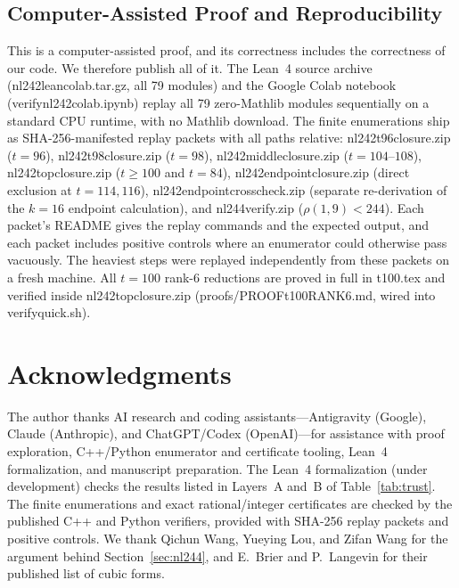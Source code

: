 \documentclass[11pt]{article}
\theoremstyle{definition}
\newcommand{\code}[1]{{\ttfamily\small\renewcommand{\_}{\textunderscore\allowbreak}#1}}
\begin{document}
\subsection{Computer-Assisted Proof and Reproducibility}
This is a computer-assisted proof, and its correctness includes the correctness of our code. We therefore publish all of it.
The Lean~4 source archive (\code{nl242\_lean\_colab.tar.gz}, all 79 modules) and the Google Colab notebook (\code{verify\_nl242\_colab.ipynb}) replay all 79 zero-Mathlib modules sequentially on a standard CPU runtime, with no Mathlib download.
The finite enumerations ship as SHA-256-manifested replay packets with all paths relative:
\code{nl242\_t96\_closure.zip} ($t = 96$),
\code{nl242\_t98\_closure.zip} ($t = 98$),
\code{nl242\_middle\_closure.zip} ($t = 104$--$108$),
\code{nl242\_top\_closure.zip} ($t \ge 100$ and $t = 84$),
\code{nl242\_endpoint\_closure.zip} (direct exclusion at $t=114,116$),
\code{nl242\_endpoint\_crosscheck.zip} (separate re-derivation of the $k=16$ endpoint calculation),
and \code{nl244\_verify.zip} ($\rho(1,9) < 244$).
Each packet's README gives the replay commands and the expected output, and each packet includes positive controls where an enumerator could otherwise pass vacuously.
The heaviest steps were replayed independently from these packets on a fresh machine. All $t = 100$ rank-$6$ reductions are proved in full in \code{t100.tex} and verified inside \code{nl242\_top\_closure.zip} (\code{proofs/PROOF\_t100\_RANK6.md}, wired into \code{verify\_quick.sh}).

\section*{Acknowledgments}
The author thanks AI research and coding assistants---Antigravity (Google), Claude (Anthropic), and ChatGPT/Codex (OpenAI)---for assistance with proof exploration, C++/Python enumerator and certificate tooling, Lean~4 formalization, and manuscript preparation. The Lean~4 formalization (under development) checks the results listed in Layers~A and~B of Table~\ref{tab:trust}. The finite enumerations and exact rational/integer certificates are checked by the published C++ and Python verifiers, provided with SHA-256 replay packets and positive controls. We thank Qichun Wang, Yueying Lou, and Zifan Wang for the argument behind Section~\ref{sec:nl244}, and E.~Brier and P.~Langevin for their published list of cubic forms.
\end{document}
